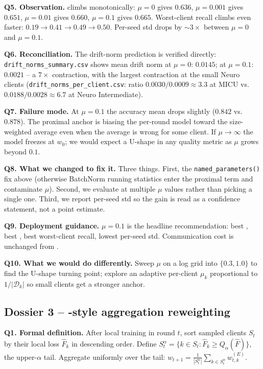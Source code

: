 \textbf{Q5. Observation.}
\auprc{} climbs monotonically: $\mu\!=\!0$ gives $0.636$, $\mu\!=\!0.001$
gives $0.651$, $\mu\!=\!0.01$ gives $0.660$, $\mu\!=\!0.1$ gives
$0.665$. Worst-client recall climbs even faster:
$0.19 \!\to\! 0.41 \!\to\! 0.49 \!\to\! 0.50$. Per-seed std drops by
$\sim$$3\!\times$ between $\mu\!=\!0$ and $\mu\!=\!0.1$.

\textbf{Q6. Reconciliation.}
The drift-norm prediction is verified directly:
\texttt{drift\_norms\_summary.csv} shows mean drift norm at
$\mu\!=\!0$: $0.0145$; at $\mu\!=\!0.1$: $0.0021$ -- a
$7\!\times$ contraction, with the largest contraction at the small
Neuro clients (\texttt{drift\_norms\_per\_client.csv}: ratio
$0.0030/0.0009 \!\approx\! 3.3$ at MICU vs.\
$0.0188/0.0028 \!\approx\! 6.7$ at Neuro Intermediate).

\textbf{Q7. Failure mode.}
At $\mu\!=\!0.1$ the accuracy mean drops slightly ($0.842$ vs.\
$0.878$). The proximal anchor is biasing the per-round model toward
the size-weighted average even when the average is wrong for some
client. If $\mu \!\to\! \infty$ the model freezes at $w_0$; we would
expect a U-shape in any quality metric as $\mu$ grows beyond $0.1$.

\textbf{Q8. What we changed to fix it.}
Three things. First, the \texttt{named\_parameters()} fix above
(otherwise BatchNorm running statistics enter the proximal term and
contaminate $\mu$). Second, we evaluate at multiple $\mu$ values rather
than picking a single one. Third, we report per-seed std so the gain
is read as a confidence statement, not a point estimate.

\textbf{Q9. Deployment guidance.}
$\mu \!=\! 0.1$ is the headline recommendation: best \auroc{}, best
\auprc{}, best worst-client recall, lowest per-seed std. Communication
cost is unchanged from \fedavg{}.

\textbf{Q10. What we would do differently.}
Sweep $\mu$ on a log grid into $\{0.3, 1.0\}$ to find the U-shape
turning point; explore an adaptive per-client $\mu_k$ proportional to
$1/|\mathcal{D}_k|$ so small clients get a stronger anchor.

\subsection{Dossier 3 -- \cvar{}-style aggregation reweighting}
\label{sec:dossier-cvar}

\textbf{Q1. Formal definition.}
After local training in round $t$, sort sampled clients $S_t$ by their
local loss $\hat F_k$ in descending order. Define
$S_t^{\alpha} = \{k \in S_t : \hat F_k \geq Q_{\alpha}(\hat F)\}$,
the upper-$\alpha$ tail. Aggregate uniformly over the tail:
$w_{t+1} = \frac{1}{|S_t^{\alpha}|}\sum_{k \in S_t^{\alpha}} w_{t,k}^{(E)}$.

